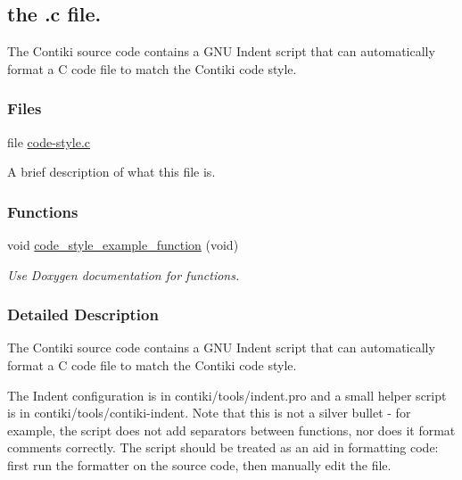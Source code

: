 \hypertarget{a00077}{}\subsection{the .c file.}
\label{a00077}


The Contiki source code contains a G\+NU Indent script that can automatically format a C code file to match the Contiki code style.  


\subsubsection*{Files}
\begin{DoxyCompactItemize}
\item 
file \hyperlink{a00001}{code-\/style.\+c}
\begin{DoxyCompactList}\small\item\em \begin{DoxyVerb}    A brief description of what this file is.\end{DoxyVerb}
 \end{DoxyCompactList}\end{DoxyCompactItemize}
\subsubsection*{Functions}
\begin{DoxyCompactItemize}
\item 
void \hyperlink{a00077_gaf4091e5d6984567763b6f5b792d2407f}{code\+\_\+style\+\_\+example\+\_\+function} (void)
\begin{DoxyCompactList}\small\item\em Use Doxygen documentation for functions. \end{DoxyCompactList}\end{DoxyCompactItemize}


\subsubsection{Detailed Description}
The Contiki source code contains a G\+NU Indent script that can automatically format a C code file to match the Contiki code style. 

The Indent configuration is in contiki/tools/indent.\+pro and a small helper script is in contiki/tools/contiki-\/indent. Note that this is not a silver bullet -\/ for example, the script does not add separators between functions, nor does it format comments correctly. The script should be treated as an aid in formatting code\+: first run the formatter on the source code, then manually edit the file. 

